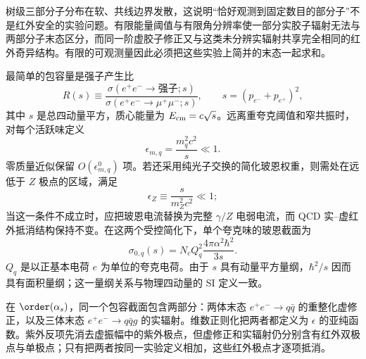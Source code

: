 树级三部分子分布在软、共线边界发散，这说明“恰好观测到固定数目的部分子”不是红外安全的实验问题。有限能量阈值与有限角分辨率使一部分实胶子辐射无法与两部分子末态区分，而同一阶虚胶子修正又与这类未分辨实辐射共享完全相同的红外奇异结构。有限的可观测量因此必须把这些实验上简并的末态一起求和。

最简单的包容量是强子产生比
\begin{equation*}
 R(s)\equiv
 \frac{\sigma(e^+e^-\to\text{强子};s)}
 {\sigma(e^+e^-\to\mu^+\mu^-;s)},
 \qquad
 s=(p_{e^-}+p_{e^+})^2,
\end{equation*}
其中 $s$ 是总四动量平方，质心能量为 $E_{\rm cm}=c\sqrt s$。远离重夸克阈值和窄共振时，对每个活跃味定义
\begin{equation*}
 \epsilon_{m,q}=\frac{m_q^2c^2}{s}\ll1.
\end{equation*}
零质量近似保留 $O(\epsilon_{m,q}^0)$ 项。若还采用纯光子交换的简化玻恩权重，则需处在远低于 $Z$ 极点的区域，满足
\begin{equation*}
 \epsilon_Z\equiv\frac{s}{m_Z^2c^2}\ll1;
\end{equation*}
当这一条件不成立时，应把玻恩电流替换为完整 $\gamma/Z$ 电弱电流，而 QCD 实--虚红外抵消结构保持不变。在这两个受控简化下，单个夸克味的玻恩截面为
\begin{equation}
 {
 \sigma_{0,q}(s)
 =N_cQ_q^2\frac{4\pi\alpha^2\hbar^2}{3s}.}
 \label{eq:qcd-r-born-sigma-si-dp12}
\end{equation}
$Q_q$ 是以正基本电荷 $e$ 为单位的夸克电荷。由于 $s$ 具有动量平方量纲，$\hbar^2/s$ 因而具有面积量纲；这一量纲关系与物理四动量的 SI 定义一致。

在 $\order(\alpha_s)$，同一个包容截面包含两部分：两体末态 $e^+e^-\to q\bar q$ 的重整化虚修正，以及三体末态 $e^+e^-\to q\bar qg$ 的实辐射。维数正则化把两者都定义为 $\epsilon$ 的亚纯函数。紫外反项先消去虚振幅中的紫外极点，但虚修正和实辐射仍分别含有红外双极点与单极点；只有把两者按同一实验定义相加，这些红外极点才逐项抵消。

